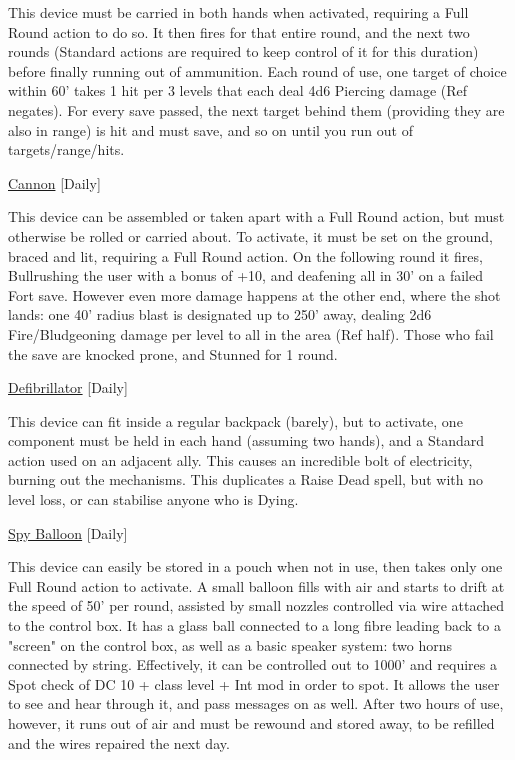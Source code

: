 \noindent This device must be carried in both hands when activated, requiring a Full Round action to do so. It then fires for that entire round, and the next two rounds (Standard actions are required to keep control of it for this duration) before finally running out of ammunition. Each round of use, one target of choice within 60' takes 1 hit per 3 levels that each deal 4d6 Piercing damage (Ref negates). For every save passed, the next target behind them (providing they are also in range) is hit and must save, and so on until you run out of targets/range/hits.

\medskip\noindent\underline{Cannon} [Daily]

\noindent This device can be assembled or taken apart with a Full Round action, but must otherwise be rolled or carried about. To activate, it must be set on the ground, braced and lit, requiring a Full Round action. On the following round it fires, Bullrushing the user with a bonus of +10, and deafening all in 30' on a failed Fort save. However even more damage happens at the other end, where the shot lands: one 40' radius blast is designated up to 250' away, dealing 2d6 Fire/Bludgeoning damage per level to all in the area (Ref half). Those who fail the save are knocked prone, and Stunned for 1 round.

\medskip\noindent\underline{Defibrillator} [Daily]

\noindent This device can fit inside a regular backpack (barely), but to activate, one component must be held in each hand (assuming two hands), and a Standard action used on an adjacent ally. This causes an incredible bolt of electricity, burning out the mechanisms. This duplicates a Raise Dead spell, but with no level loss, or can stabilise anyone who is Dying.

\medskip\noindent\underline{Spy Balloon} [Daily]

\noindent This device can easily be stored in a pouch when not in use, then takes only one Full Round action to activate. A small balloon fills with air and starts to drift at the speed of 50' per round, assisted by small nozzles controlled via wire attached to the control box. It has a glass ball connected to a long fibre leading back to a "screen" on the control box, as well as a basic speaker system: two horns connected by string. Effectively, it can be controlled out to 1000' and requires a Spot check of DC 10 + class level + Int mod in order to spot. It allows the user to see and hear through it, and pass messages on as well. After two hours of use, however, it runs out of air and must be rewound and stored away, to be refilled and the wires repaired the next day.

